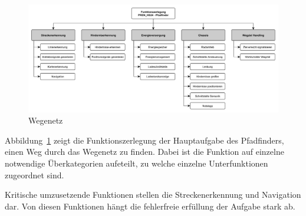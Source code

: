 \documentclass[../main.tex]{subfiles}
\begin{document}
\begin{figure}[h!]
    \centering
    \includegraphics[width=1\textwidth]{./resources/Funktionszerlegung}
    \caption{Wegenetz}\label{fig:Funktionszerlegung}
\end{figure}

Abbildung~\ref{fig:Funktionszerlegung} zeigt die Funktionszerlegung der
Hauptaufgabe des Pfadfinders, einen Weg durch das Wegenetz zu finden. Dabei ist
die Funktion auf einzelne notwendige Überkategorien aufeteilt, zu welche
einzelne Unterfunktionen zugeordnet sind.

Kritische umzusetzende Funktionen stellen die Streckenerkennung und Navigation
dar. Von diesen Funktionen hängt die fehlerfreie erfüllung der Aufgabe stark
ab.
\end{document}
